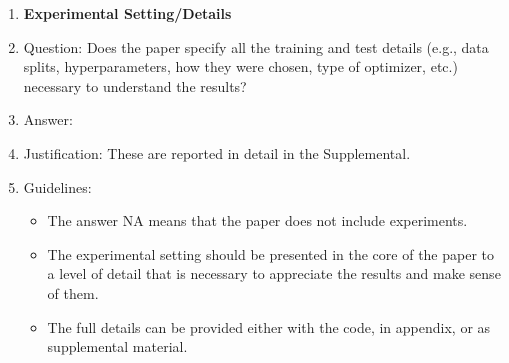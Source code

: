 \documentclass{article} %
\theoremstyle{definition}
\theoremstyle{remark}
\begin{document}
\begin{enumerate}
\item {\bf Experimental Setting/Details}
    \item[] Question: Does the paper specify all the training and test details (e.g., data splits, hyperparameters, how they were chosen, type of optimizer, etc.) necessary to understand the results?
    \item[] Answer: \answerYes{} %
    \item[] Justification: These are reported in detail in the Supplemental.
    \item[] Guidelines:
    \begin{itemize}
        \item The answer NA means that the paper does not include experiments.
        \item The experimental setting should be presented in the core of the paper to a level of detail that is necessary to appreciate the results and make sense of them.
        \item The full details can be provided either with the code, in appendix, or as supplemental material.
    \end{itemize}


\end{enumerate}
\end{document}
